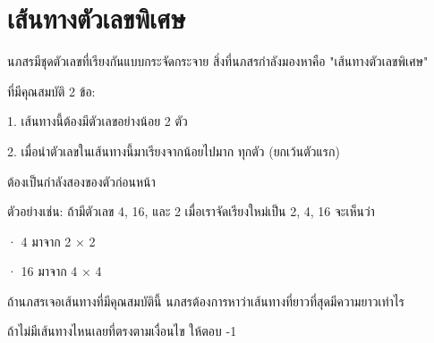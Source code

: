 \documentclass{article}
\begin{document}
\section*{เส้นทางตัวเลขพิเศษ}

นภสรมีชุดตัวเลขที่เรียงกันแบบกระจัดกระจาย สิ่งที่นภสรกำลังมองหาคือ "เส้นทางตัวเลขพิเศษ"

ที่มีคุณสมบัติ 2 ข้อ:



1. เส้นทางนี้ต้องมีตัวเลขอย่างน้อย 2 ตัว



2. เมื่อนำตัวเลขในเส้นทางนี้มาเรียงจากน้อยไปมาก ทุกตัว (ยกเว้นตัวแรก)

ต้องเป็นกำลังสองของตัวก่อนหน้า



\hfill\break



ตัวอย่างเช่น: ถ้ามีตัวเลข 4, 16, และ 2 เมื่อเราจัดเรียงใหม่เป็น 2, 4, 16 จะเห็นว่า



· 4 มาจาก 2 × 2



· 16 มาจาก 4 × 4



ถ้านภสรเจอเส้นทางที่มีคุณสมบัตินี้ นภสรต้องการหาว่าเส้นทางที่ยาวที่สุดมีความยาวเท่าไร

ถ้าไม่มีเส้นทางไหนเลยที่ตรงตามเงื่อนไข ให้ตอบ -1



\hfill\break
\end{document}
